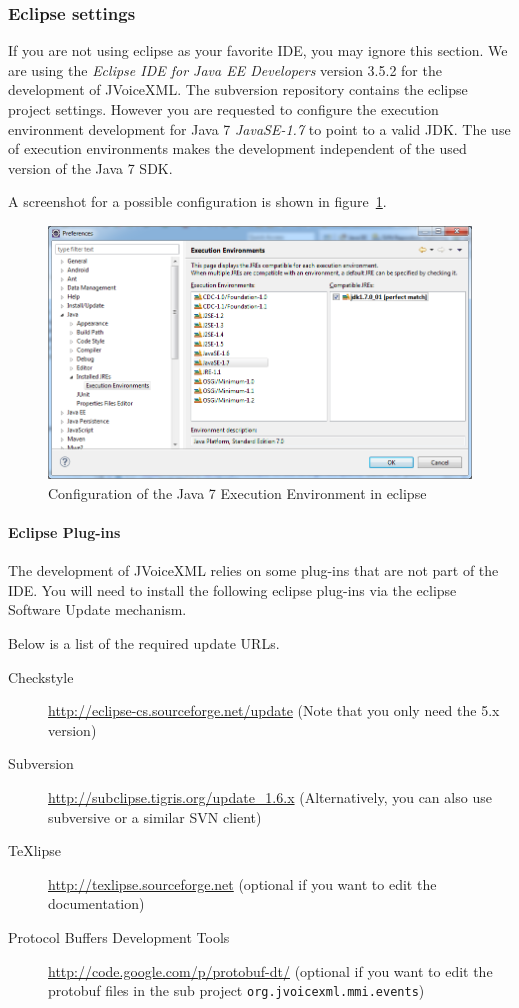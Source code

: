 \documentclass[11pt,a4paper]{article}
\begin{document}
\subsubsection{Eclipse settings}
\label{sec:eclipse}

If you are not using eclipse as your favorite IDE, you may ignore this section.
We are using the \emph{Eclipse IDE for Java EE Developers} version 3.5.2 for
the development of JVoiceXML. The subversion repository contains the eclipse
project settings. However you are requested to configure the execution
environment development for Java 7 \emph{JavaSE-1.7} to point to a valid JDK.
The use of execution environments makes the development independent of the
used version of the Java 7 SDK.

A screenshot for a possible configuration is shown in
figure~\ref{fig:eclipse-execution-environments}.
\begin{figure}
\includegraphics[width=\linewidth]{eclipse-execution-environments}
\caption{Configuration of the Java 7 Execution Environment in eclipse}
\label{fig:eclipse-execution-environments}
\end{figure}

\paragraph{Eclipse Plug-ins}

The development of JVoiceXML relies on some plug-ins that are not part of the
IDE. You will need to install the following eclipse plug-ins via the eclipse
Software Update mechanism.

Below is a list of the required update URLs.

\begin{description}
\item[Checkstyle] \url{http://eclipse-cs.sourceforge.net/update} (Note that you
only need the 5.x version)
\item[Subversion] \url{http://subclipse.tigris.org/update_1.6.x}
(Alternatively, you can also use subversive or a similar SVN client)
\item[TeXlipse] \url{http://texlipse.sourceforge.net} (optional if you want to
edit the documentation)
\item[Protocol Buffers Development Tools] \url{http://code.google.com/p/protobuf-dt/}
(optional if you want to edit the protobuf files in the sub project \texttt{org.jvoicexml.mmi.events})
\end{description}
\end{document}

